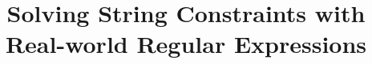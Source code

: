 \documentclass{llncs}
\begin{document}
\title{Solving String Constraints with \\
Real-world Regular Expressions}



\author{}
\institute{}

\maketitle



\end{document}

